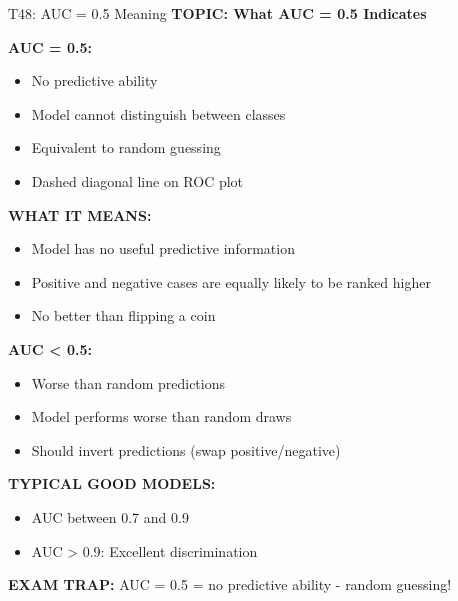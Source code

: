 \documentclass[8pt]{beamer}
\begin{document}
	\begin{frame}{T48: AUC = 0.5 Meaning}
		\fontsize{6.5}{7.5}\selectfont
		\textbf{TOPIC: What AUC = 0.5 Indicates}
		
		\vspace{0.1cm}
		\textbf{AUC = 0.5:}
		\begin{itemize}
			\item No predictive ability
			\item Model cannot distinguish between classes
			\item Equivalent to random guessing
			\item Dashed diagonal line on ROC plot
		\end{itemize}
		
		\vspace{0.1cm}
		\textbf{WHAT IT MEANS:}
		\begin{itemize}
			\item Model has no useful predictive information
			\item Positive and negative cases are equally likely to be ranked higher
			\item No better than flipping a coin
		\end{itemize}
		
		\vspace{0.1cm}
		\textbf{AUC < 0.5:}
		\begin{itemize}
			\item Worse than random predictions
			\item Model performs worse than random draws
			\item Should invert predictions (swap positive/negative)
		\end{itemize}
		
		\vspace{0.1cm}
		\textbf{TYPICAL GOOD MODELS:}
		\begin{itemize}
			\item AUC between 0.7 and 0.9
			\item AUC > 0.9: Excellent discrimination
		\end{itemize}
		
		\textcolor{myred}{\textbf{EXAM TRAP:}} AUC = 0.5 = \textcolor{myblue}{no predictive ability} - random guessing!
	\end{frame}
	
\end{document}
